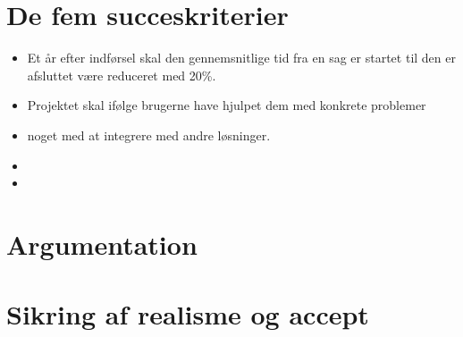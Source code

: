 \documentclass[10pt,a4paper,danish]{article}
\title{}
\author{Søren Pilgård, 190689, vpb984\\Caroline Miller, 04071979, twq135\\Rene}
\begin{document}
\maketitle
\newpage

\tableofcontents
\newpage

\section{De fem succeskriterier}

\begin{itemize}
\item Et år efter indførsel skal den gennemsnitlige tid fra en sag er startet til den er afsluttet være reduceret med 20\%.
\item Projektet skal ifølge brugerne have hjulpet dem med konkrete problemer
\item noget med at integrere med andre løsninger.
\item
\item
\end{itemize}

\section{Argumentation}

\section{Sikring af realisme og accept}
\end{document}
